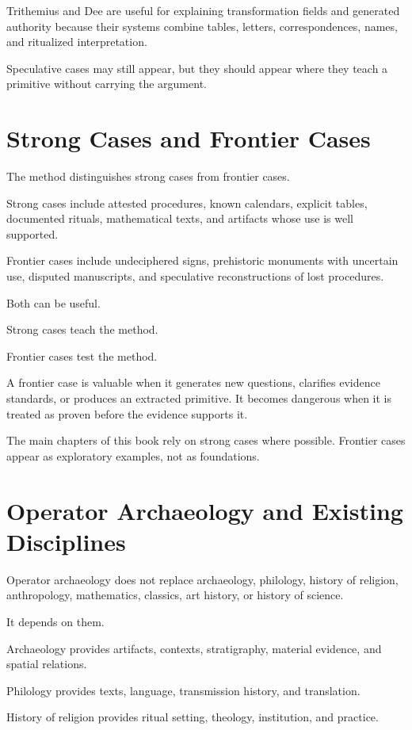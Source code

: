 \documentclass[11pt]{book}
\begin{document}
Trithemius and Dee are useful for explaining transformation fields and generated authority because their systems combine tables, letters, correspondences, names, and ritualized interpretation.

Speculative cases may still appear, but they should appear where they teach a primitive without carrying the argument.

\section{Strong Cases and Frontier Cases}

The method distinguishes strong cases from frontier cases.

Strong cases include attested procedures, known calendars, explicit tables, documented rituals, mathematical texts, and artifacts whose use is well supported.

Frontier cases include undeciphered signs, prehistoric monuments with uncertain use, disputed manuscripts, and speculative reconstructions of lost procedures.

Both can be useful.

Strong cases teach the method.

Frontier cases test the method.

A frontier case is valuable when it generates new questions, clarifies evidence standards, or produces an extracted primitive. It becomes dangerous when it is treated as proven before the evidence supports it.

The main chapters of this book rely on strong cases where possible. Frontier cases appear as exploratory examples, not as foundations.

\section{Operator Archaeology and Existing Disciplines}

Operator archaeology does not replace archaeology, philology, history of religion, anthropology, mathematics, classics, art history, or history of science.

It depends on them.

Archaeology provides artifacts, contexts, stratigraphy, material evidence, and spatial relations.

Philology provides texts, language, transmission history, and translation.

History of religion provides ritual setting, theology, institution, and practice.
\end{document}
